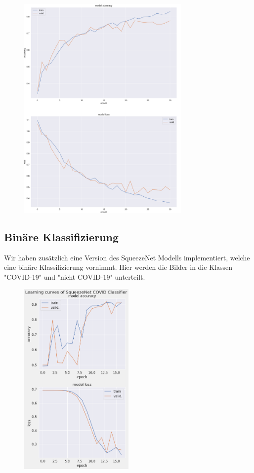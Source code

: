 \begin{figure}[H]
    \centering
    \includegraphics[width=0.75\textwidth]{../results/SqueezeNet_curves.png}
    \caption{}
\end{figure}

\subsection{Binäre Klassifizierung}

Wir haben zusätzlich eine Version des SqueezeNet Modells implementiert, welche eine binäre Klassifizierung vornimmt. Hier werden die Bilder in die Klassen "COVID-19" und "nicht COVID-19" unterteilt.

\begin{figure}[H]
    \centering
    \includegraphics[width=0.5\textwidth]{../results/Binary_SqueezeNet_curves.png}
    \caption{}
\end{figure}